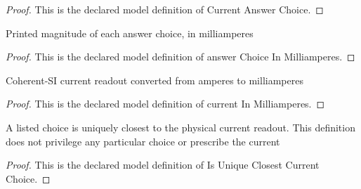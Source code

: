 \begin{proof}
  This is the declared model definition of Current Answer Choice.
\end{proof}
\begin{definition}
  \label{def:physics:phyx-mini-0982:phyxminiproblems-problemphyxmini0982-answerchoiceinmilliamperes}
  Printed magnitude of each answer choice, in milliamperes
\end{definition}
\begin{proof}
  This is the declared model definition of answer Choice In Milliamperes.
\end{proof}
\begin{definition}
  \label{def:physics:phyx-mini-0982:phyxminiproblems-problemphyxmini0982-currentinmilliamperes}
  Coherent-SI current readout converted from amperes to milliamperes
\end{definition}
\begin{proof}
  This is the declared model definition of current In Milliamperes.
\end{proof}
\begin{definition}
  \label{def:physics:phyx-mini-0982:phyxminiproblems-problemphyxmini0982-isuniqueclosestcurrentchoice}
  A listed choice is uniquely closest to the physical current readout. This definition does not privilege any particular choice or prescribe the current
\end{definition}
\begin{proof}
  This is the declared model definition of Is Unique Closest Current Choice.
\end{proof}
